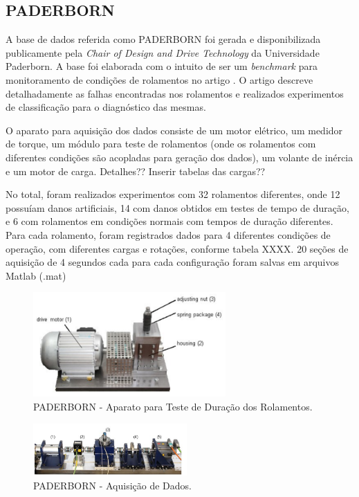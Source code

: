 \documentclass[letterpaper]{article}
\begin{document}
\subsection{PADERBORN}

A base de dados referida como PADERBORN foi gerada e disponibilizada publicamente pela \textit{Chair of Design and Drive Technology} da Universidade Paderborn. A base foi elaborada com o intuito de ser um \textit{benchmark} para monitoramento de condições de rolamentos no artigo \cite{lessmeier2016condition}. O artigo descreve detalhadamente as falhas encontradas nos rolamentos e realizados experimentos de classificação para o diagnóstico das mesmas.

O aparato para aquisição dos dados consiste de um motor elétrico, um medidor de torque, um módulo para teste de rolamentos (onde os rolamentos com diferentes condições são acopladas para geração dos dados), um volante de inércia e um motor de carga. Detalhes?? Inserir tabelas das cargas??

No total, foram realizados experimentos com 32 rolamentos diferentes, onde 12 possuíam danos artificiais, 14 com danos obtidos em testes de tempo de duração, e 6 com rolamentos em condições normais com tempos de duração diferentes. Para cada rolamento, foram registrados dados para 4 diferentes condições de operação, com diferentes cargas e rotações, conforme tabela XXXX. 20 seções de aquisição de 4 segundos cada para cada configuração foram salvas em arquivos Matlab (.mat)

\begin{figure}[H]
    \centering
    \includegraphics[height=40mm]{imagens/PADERBORN_Force.PNG}
    \caption{PADERBORN - Aparato para Teste de Duração dos Rolamentos.}
    \label{fig:PADERBORN_fail}
\end{figure}

\begin{figure}[H]
    \centering
    \includegraphics[height=20mm]{imagens/PADERBORN_Equipment.PNG}
    \caption{PADERBORN - Aquisição de Dados.}
    \label{fig:PADERBORN_eq}
\end{figure}
\end{document}
